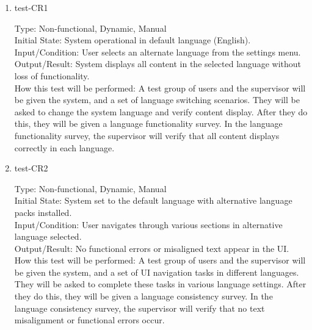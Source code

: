 \documentclass[12pt, titlepage]{article}
\begin{document}
\begin{enumerate}
    \item{test-CR1\\} \label{test-CR1}
    
    Type: Non-functional, Dynamic, Manual\\
    
    Initial State: System operational in default language (English).\\
    
    Input/Condition: User selects an alternate language from the settings menu.\\
    
    Output/Result: System displays all content in the selected language without loss of functionality.\\
    
    How this test will be performed: A test group of users and the supervisor will be given the system, and a set of language switching scenarios. They will be asked to change the system language and verify content display. After they do this, they will be given a language functionality survey. In the language functionality survey, the supervisor will verify that all content displays correctly in each language.

    \item{test-CR2\\} \label{test-CR2}
    
    Type: Non-functional, Dynamic, Manual\\
    
    Initial State: System set to the default language with alternative language packs installed.\\

    Input/Condition: User navigates through various sections in alternative language selected.\\
    
    Output/Result: No functional errors or misaligned text appear in the UI.\\
    
    How this test will be performed: A test group of users and the supervisor will be given the system, and a set of UI navigation tasks in different languages. They will be asked to complete these tasks in various language settings. After they do this, they will be given a language consistency survey. In the language consistency survey, the supervisor will verify that no text misalignment or functional errors occur.

\end{enumerate}
\end{document}
